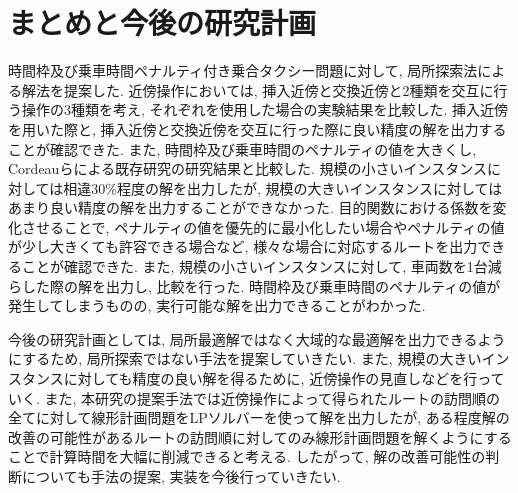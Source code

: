 \chapter{まとめと今後の研究計画}\label{conclution}
時間枠及び乗車時間ペナルティ付き乗合タクシー問題に対して, 局所探索法による解法を提案した. 近傍操作においては, 挿入近傍と交換近傍と2種類を交互に行う操作の3種類を考え, それぞれを使用した場合の実験結果を比較した. 挿入近傍を用いた際と, 挿入近傍と交換近傍を交互に行った際に良い精度の解を出力することが確認できた. また, 時間枠及び乗車時間のペナルティの値を大きくし, Cordeauらによる既存研究の研究結果と比較した. 規模の小さいインスタンスに対しては相違30\%程度の解を出力したが, 規模の大きいインスタンスに対してはあまり良い精度の解を出力することができなかった. 目的関数における係数を変化させることで, ペナルティの値を優先的に最小化したい場合やペナルティの値が少し大きくても許容できる場合など, 様々な場合に対応するルートを出力できることが確認できた. 
また, 規模の小さいインスタンスに対して, 車両数を1台減らした際の解を出力し, 比較を行った. 時間枠及び乗車時間のペナルティの値が発生してしまうものの, 実行可能な解を出力できることがわかった.

今後の研究計画としては, 局所最適解ではなく大域的な最適解を出力できるようにするため, 局所探索ではない手法を提案していきたい.
また, 規模の大きいインスタンスに対しても精度の良い解を得るために, 近傍操作の見直しなどを行っていく.
また, 本研究の提案手法では近傍操作によって得られたルートの訪問順の全てに対して線形計画問題をLPソルバーを使って解を出力したが, ある程度解の改善の可能性があるルートの訪問順に対してのみ線形計画問題を解くようにすることで計算時間を大幅に削減できると考える. したがって, 解の改善可能性の判断についても手法の提案, 実装を今後行っていきたい.
